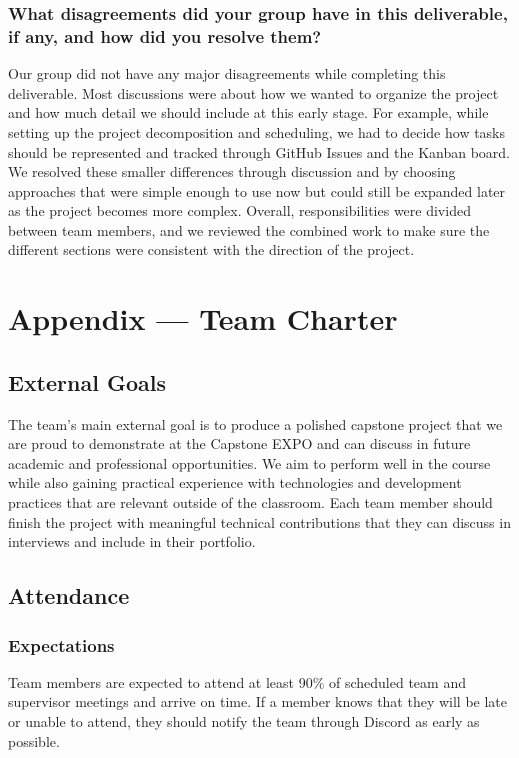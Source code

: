 \documentclass{article}
\begin{document}
\subsubsection*{What disagreements did your group have in this deliverable, if any,
    and how did you resolve them?}
Our group did not have any major disagreements while completing this deliverable. Most discussions were about how we wanted to 
organize the project and how much detail we should include at this early stage. For example, while setting up the project decomposition 
and scheduling, we had to decide how tasks should be represented and tracked through GitHub Issues and the Kanban board. We resolved these 
smaller differences through discussion and by choosing approaches that were simple enough to use now but could still be expanded later as 
the project becomes more complex. Overall, responsibilities were divided between team members, and we reviewed the combined work to make 
sure the different sections were consistent with the direction of the project.

\newpage{}

\section*{Appendix --- Team Charter}

\subsection*{External Goals}

The team’s main external goal is to produce a polished capstone project that we are proud to demonstrate at the Capstone EXPO and can discuss in future academic and professional opportunities. We aim to perform well in the course while also gaining practical experience with technologies and development practices that are relevant outside of the classroom. Each team member should finish the project with meaningful technical contributions that they can discuss in interviews and include in their portfolio.
\subsection*{Attendance}

\subsubsection*{Expectations}

Team members are expected to attend at least 90\% of scheduled team and supervisor meetings and arrive on time. If a member knows that they will be late or unable to attend, they should notify the team through Discord as early as possible.
\end{document}
